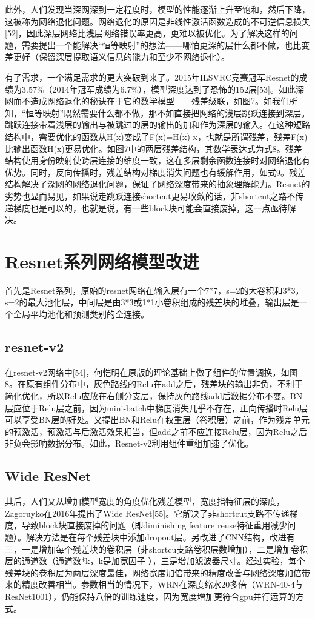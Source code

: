 \documentclass[15pt]{article}
\begin{document}
此外，人们发现当深网深到一定程度时，模型的性能逐渐上升至饱和，然后下降，这被称为网络退化问题。网络退化的原因是非线性激活函数造成的不可逆信息损失[52]，因此深层网络比浅层网络错误率更高，更难以被优化。为了解决这样的问题，需要提出一个能解决“恒等映射”的想法——哪怕更深的层什么都不做，也比变差更好（保留深层提取语义信息的能力和至少不网络退化）。

有了需求，一个满足需求的更大突破到来了。2015年ILSVRC竞赛冠军Resnet的成绩为3.57\%（2014年冠军成绩为6.7\%），模型深度达到了恐怖的152层[53]。如此深网而不造成网络退化的秘诀在于它的数学模型——残差级联，如图7。如我们所知，“恒等映射”既然需要什么都不做，那不如直接把网络的浅层跳跃连接到深层。跳跃连接带着浅层的输出与被跳过的层的输出的加和作为深层的输入。在这种短路结构中，需要优化的函数从H(x)变成了F(x)=H(x)-x，也就是所谓残差，残差F(x)比输出函数H(x)更易优化。如图7中的两层残差结构，其数学表达式为式8。残差结构使用身份映射使跨层连接的维度一致，这在多层剩余函数连接时对网络退化有优势。同时，反向传播时，残差结构对梯度消失问题也有缓解作用，如式9。残差结构解决了深网的网络退化问题，保证了网络深度带来的抽象理解能力。Resnet的劣势也显而易见，如果说走跳跃连接shortcut更易收敛的话，非shortcut之路不传递梯度也是可以的，也就是说，有一些block块可能会直接废掉，这一点亟待解决。

\section{Resnet系列网络模型改进}
首先是Resnet系列，原始的resnet网络在输入层有一个7*7，s=2的大卷积和3*3，s=2的最大池化层，中间层是由3*3或1*1小卷积组成的残差块的堆叠，输出层是一个全局平均池化和预测类别的全连接。

\subsection{resnet-v2}
在resnet-v2网络中[54]，何恺明在原版的理论基础上做了组件的位置调换，如图8。在原有组件分布中，灰色路线的Relu在add之后，残差块的输出非负，不利于简化优化，所以Relu应放在右侧分支层，保持灰色路线add后数据分布不变。BN层应位于Relu层之前，因为mini-batch中梯度消失几乎不存在，正向传播时Relu层可以享受BN层的好处。又提出BN和Relu在权重层（卷积层）之前，作为残差单元的预激活，预激活与后激活效果相当，但add之前不应连接Relu层，因为Relu之后非负会影响数据分布。如此，Resnet-v2利用组件重组加速了优化。

\subsection{Wide ResNet}
其后，人们又从增加模型宽度的角度优化残差模型，宽度指特征层的深度，Zagoruyko在2016年提出了Wide ResNet[55]。它解决了非shortcut支路不传递梯度，导致block块直接废掉的问题（即diminishing feature reuse特征重用减少问题）。解决方法是在每个残差块中添加dropout层。另改进了CNN结构，改进有三，一是增加每个残差块的卷积层（非shortcu支路卷积层数增加），二是增加卷积层的通道数（通道数*k，k是加宽因子 ），三是增加滤波器尺寸。经过实验，每个残差块的卷积层为两层深度最佳，网络宽度加倍带来的精度改善与网络深度加倍带来的精度改善相当。参数相当的情况下，WRN在深度缩水20多倍（WRN-40-4与ResNet1001），仍能保持八倍的训练速度，因为宽度增加更符合gpu并行运算的方式。
\end{document}
